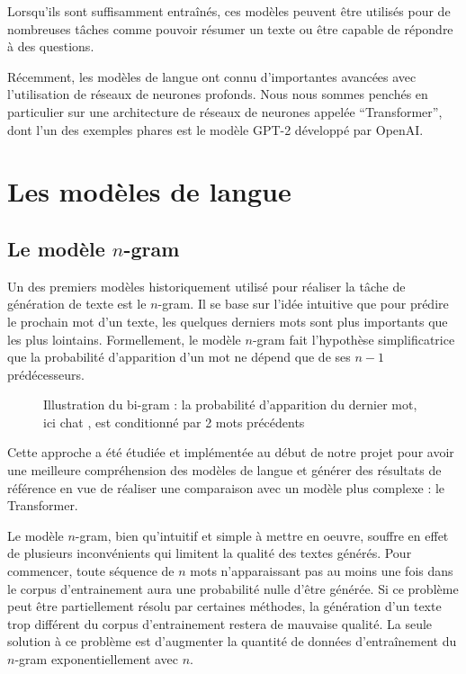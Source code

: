 Lorsqu'ils sont suffisamment entraînés, ces modèles peuvent être utilisés pour de nombreuses tâches comme pouvoir résumer un texte ou être capable de répondre à des questions.

Récemment, les modèles de langue ont connu d’importantes avancées avec l’utilisation de réseaux de neurones profonds.
Nous nous sommes penchés en particulier sur une architecture de réseaux de neurones appelée “Transformer”, dont l’un des exemples phares est le modèle \og GPT-2 \fg{} développé par OpenAI. \\

\section{Les modèles de langue}
\subsection{Le modèle $n$-gram}

Un des premiers modèles historiquement utilisé pour réaliser la tâche de génération de texte est le $n$-gram. Il se base sur l'idée intuitive que pour prédire le prochain mot d'un texte, les quelques derniers mots sont plus importants que les plus lointains. Formellement, le modèle $n$-gram fait l'hypothèse simplificatrice que la probabilité d'apparition d'un mot ne dépend que de ses $n-1$ prédécesseurs.

\begin{figure}[h]
\begin{center}
\caption{Illustration du bi-gram : la probabilité d'apparition du dernier mot, ici \og chat \fg{}, est conditionné par 2 mots précédents}
\end{center}
\end{figure}


Cette approche a été étudiée et implémentée au début de notre projet pour avoir une meilleure compréhension des modèles de langue et générer des résultats de référence en vue de réaliser une comparaison avec un modèle plus complexe : le Transformer.

Le modèle $n$-gram, bien qu'intuitif et simple à mettre en oeuvre, souffre en effet de plusieurs inconvénients qui limitent la qualité des textes générés. Pour commencer, toute séquence de $n$ mots n'apparaissant pas au moins une fois dans le corpus d'entrainement aura une probabilité nulle d'être générée.
Si ce problème peut être partiellement résolu par certaines méthodes, la génération d'un texte trop différent du corpus d'entrainement restera de mauvaise qualité. La seule solution à ce problème est d'augmenter la quantité de données d'entraînement du $n$-gram exponentiellement avec $n$.

